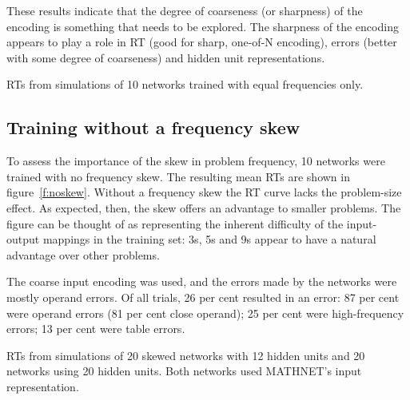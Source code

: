 These results indicate that the degree of coarseness (or sharpness) of the
encoding is something that needs to be explored.  The sharpness of the
encoding appears
to play a role in RT (good for sharp, one-of-N encoding),
errors (better with some degree of coarseness) and hidden unit
representations.

\begin{fancyfigure}
\centerline{}
\caption{RTs from simulations of 10 networks trained with equal
frequencies only.}
\label{f:noskew}
\end{fancyfigure}

\subsection{Training without a frequency skew}\label{s:noskew}

To assess the importance of the skew in problem frequency, 10 networks were
trained with no frequency skew.  The resulting mean RTs are shown in
figure~\ref{f:noskew}.  Without a frequency skew the RT curve lacks the
problem-size effect.  As expected, then, the skew offers an advantage to
smaller problems.  The figure can be thought of as representing the
inherent difficulty of the input-output mappings in the training set: 3s,
5s and 9s appear to have a natural advantage over other problems.

The coarse input encoding was used, and the errors made by the networks
were mostly operand errors.  Of all trials, 26 per cent resulted in an
error: 87 per cent were operand errors (81 per cent close operand); 25 per
cent were high-frequency errors; 13 per cent were table errors.




\begin{fancyfigure}
\centerline{}
\caption{RTs from simulations of 20 skewed networks with 12 hidden
units and 20 networks using 20 hidden units.  Both networks used
MATHNET's input representation.}
\label{f:mnsimrt}
\end{fancyfigure}

